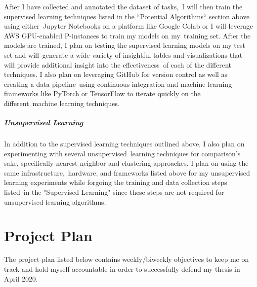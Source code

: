 \documentclass[letterpaper,12pt]{article}
\begin{document}
After I have collected and annotated the dataset of tasks,\
I will then train the supervised learning techniques listed in the ``Potential Algorithms`` section above using either\
Jupyter Notebooks on a platform like Google Colab or I will leverage AWS GPU-enabled P-instances to train my models on my\
training set. After the models are trained, I plan on testing the supervised learning models on my test set and will\
generate a wide-variety of insightful tables and visualizations that will provide additional insight into the effectiveness\
of each of the different techniques. I also plan on leveraging GitHub for version control as well as creating a data pipeline\
using continuous integration and machine learning frameworks like PyTorch or TensorFlow to iterate quickly on the different\
machine learning techniques.

\paragraph{Unsupervised Learning}
In addition to the supervised learning techniques outlined above, I also plan on experimenting with several unsupervised\
learning techniques for comparison's sake, specifically nearest neighbor and clustering approaches. I plan on using the same infrastructure,\
hardware, and frameworks listed above for my unsupervised learning experiments while forgoing the training and data collection steps listed\
in the "Supervised Learning" since these steps are not required for unsupervised learning algorithms.
\chapter{Project Plan}
The project plan listed below contains weekly/biweekly objectives to keep me on track and hold myself accountable in order
to successfully defend my thesis in April 2020.
\end{document}
